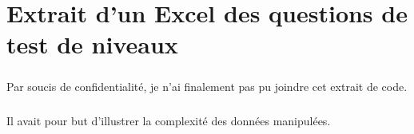 \chapter{Extrait d'un Excel des questions de test de niveaux}
\label{ch:leveltest-sample}

\paragraph{}
Par soucis de confidentialité, je n'ai finalement pas pu joindre cet extrait de code.

\paragraph{}
Il avait pour but d'illustrer la complexité des données manipulées.
